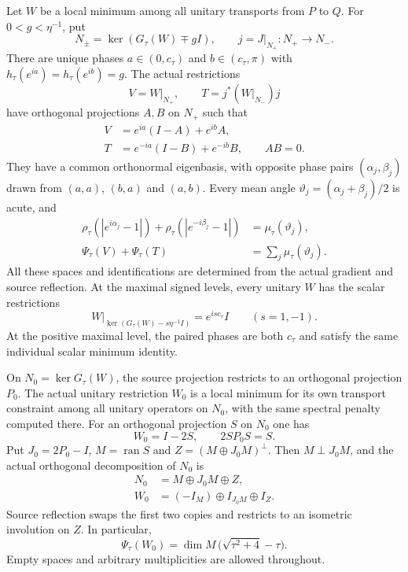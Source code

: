 \begin{proposition}
\label{prop:smoothed-ambient-gradient-blocks}
Let $W$ be a local minimum among all unitary transports from $P$ to $Q$.
For $0<g<\eta^{-1}$, put
\[
 N_\pm=\ker(G_\tau(W)\mp gI),\qquad j=J|_{N_+}:N_+\to N_-.
\]
There are unique phases $a\in(0,c_\tau)$ and $b\in(c_\tau,\pi)$
with $h_\tau(e^{ia})=h_\tau(e^{ib})=g$. The actual restrictions
\[
 V=W|_{N_+},\qquad T=j^*(W|_{N_-})j
\]
have orthogonal projections $A,B$ on $N_+$ such that
\[
 \begin{aligned}
 V&=e^{ia}(I-A)+e^{ib}A,\\
 T&=e^{-ia}(I-B)+e^{-ib}B,\qquad AB=0.
 \end{aligned}
\]
They have a common orthonormal eigenbasis, with opposite phase pairs
$(\alpha_j,\beta_j)$ drawn from $(a,a)$, $(b,a)$ and $(a,b)$.
Every mean angle $\vartheta_j=(\alpha_j+\beta_j)/2$ is acute, and
\[
 \begin{aligned}
 \rho_\tau(|e^{i\alpha_j}-1|)
   +\rho_\tau(|e^{-i\beta_j}-1|)&=\mu_\tau(\vartheta_j),\\
 \Psi_\tau(V)+\Psi_\tau(T)&=\sum_j\mu_\tau(\vartheta_j).
 \end{aligned}
\]
All these spaces and identifications are determined from the actual
gradient and source reflection. At the maximal signed levels, every
unitary $W$ has the scalar restrictions
\[
 W|_{\ker(G_\tau(W)-s\eta^{-1}I)}=e^{is c_\tau}I
 \qquad(s=1,-1).
\]
At the positive maximal level, the paired phases are both $c_\tau$
and satisfy the same individual scalar minimum identity.

On $N_0=\ker G_\tau(W)$, the source projection restricts to an
orthogonal projection $P_0$. The actual unitary restriction $W_0$ is
a local minimum for its own transport constraint among all unitary
operators on $N_0$, with the same spectral penalty computed there.
For an orthogonal projection $S$ on $N_0$ one has
\[
 W_0=I-2S,\qquad 2SP_0S=S.
\]
Put $J_0=2P_0-I$, $M=\operatorname{ran}S$ and
$Z=(M\oplus J_0M)^\perp$. Then $M\perp J_0M$, and the actual
orthogonal decomposition of $N_0$ is
\[
 \begin{aligned}
 N_0&=M\oplus J_0M\oplus Z,\\
 W_0&=(-I_M)\oplus I_{J_0M}\oplus I_Z.
 \end{aligned}
\]
Source reflection swaps the first two copies and restricts to an
isometric involution on $Z$. In particular,
\[
 \Psi_\tau(W_0)=\dim M\,\bigl(\sqrt{\tau^2+4}-\tau\bigr).
\]
Empty spaces and arbitrary multiplicities are allowed throughout.
\end{proposition}

